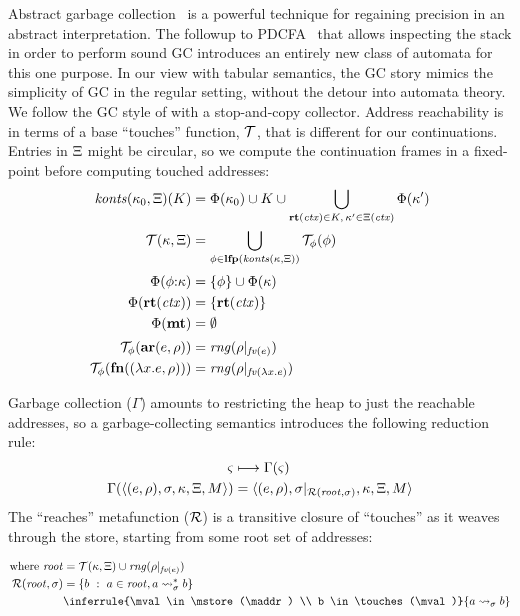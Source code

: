 Abstract garbage collection~\citep{dvanhorn:Might:2006:GammaCFA} is a powerful technique for regaining precision in an abstract interpretation.
%
The followup to PDCFA~\citet{dvanhorn:Earl2012Introspective} that allows inspecting the stack in order to perform sound GC introduces an entirely new class of automata for this one purpose.
%
In our view with tabular semantics, the GC story mimics the simplicity of GC in the regular setting, without the detour into automata theory.
%
We follow the GC style of \citet{dvanhorn:Might:2006:GammaCFA} with a stop-and-copy collector.
%
Address reachability is in terms of a base ``touches'' function, ${\mathcal T}$, that is different for our continuations.
%
Entries in $\Xi$ might be circular, so we compute the continuation frames in a fixed-point before computing touched addresses:
\begin{align*}
  \mathit{konts}(\kappa_0, \Xi)(K) &= \Phi(\kappa_0) \cup K \cup \bigcup\limits_{\mathbf{rt}(\mathit{ctx}) \in K,\, \kappa' \in \Xi(\mathit{ctx})}{\Phi(\kappa')}
\\
  {\mathcal T}(\kappa, \Xi) &= \bigcup\limits_{\phi \in \mathbf{lfp}(\mathit{konts}(\kappa, \Xi))}{{\mathcal T}_{\phi}(\phi)}
\\[2pt]
  \Phi(\phi{\tt :} \kappa) &= \{ \phi \} \cup \Phi(\kappa) \\
  \Phi(\mathbf{rt}(\mathit{ctx})) &= \{ \mathbf{rt}(\mathit{ctx}) \} \\
  \Phi(\mathbf{mt}) &= \emptyset 
\\[2pt]
  {\mathcal T}_{\phi}(\mathbf{ar}{}(e,\rho)) &= \mathit{rng}(\rho|_{\mathit{fv}(e)}) \\
  {\mathcal T}_{\phi}(\mathbf{fn}{}((\lambda{} x. e,\rho))) &= \mathit{rng}(\rho|_{\mathit{fv}(\lambda{} x. e)})
\end{align*}

Garbage collection ($\Gamma$) amounts to restricting the heap to just the reachable addresses, so a garbage-collecting semantics introduces the following reduction rule:
\begin{align*}
  \varsigma &\longmapsto \Gamma(\varsigma) \\
  \Gamma(\langle (e,\rho),\sigma,\kappa, \Xi, M \rangle) &= \langle (e,\rho),\sigma|_{{\mathcal R}(\mathit{root}, \sigma)}, \kappa, \Xi, M \rangle \\
\end{align*}
%
The ``reaches'' metafunction (${\mathcal R}$) is a transitive closure of ``touches'' as it weaves through the store, starting from some root set of addresses:

\begin{align*}
  \text{where } \mathit{root} &= \touches(\mkont,\mktab) \cup \mathit{rng}(\menv|_{\mathit{fv}(\mexpr)}) \\
  \reaches(\mathit{root}, \mstore) &= \setbuild{b}{\maddr \in \mathit{root}, \maddr \rightsquigarrow_\mstore^* b} \\
   &
               \inferrule{\mval \in \mstore(\maddr) \\
                             b \in \touches(\mval)}
                            {\maddr \rightsquigarrow_\mstore b}
\end{align*}

